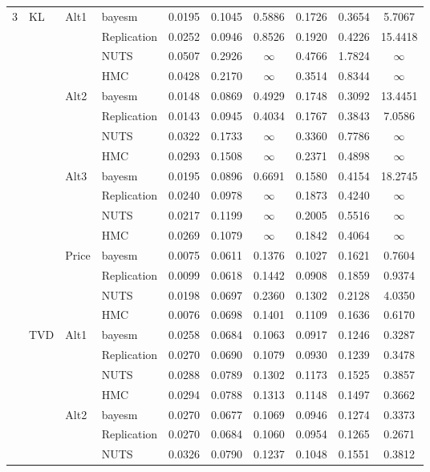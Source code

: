 \begin{longtable}{clllcccccc}
3 & KL & Alt1 & bayesm & 0.0195 & 0.1045 & 0.5886 & 0.1726 & 0.3654 & 5.7067 \\
 &  &  & Replication & 0.0252 & 0.0946 & 0.8526 & 0.1920 & 0.4226 & 15.4418 \\
 &  &  & NUTS & 0.0507 & 0.2926 & $\infty$ & 0.4766 & 1.7824 & $\infty$ \\
 &  &  & HMC & 0.0428 & 0.2170 & $\infty$ & 0.3514 & 0.8344 & $\infty$ \\
 &  & Alt2 & bayesm & 0.0148 & 0.0869 & 0.4929 & 0.1748 & 0.3092 & 13.4451 \\
 &  &  & Replication & 0.0143 & 0.0945 & 0.4034 & 0.1767 & 0.3843 & 7.0586 \\
 &  &  & NUTS & 0.0322 & 0.1733 & $\infty$ & 0.3360 & 0.7786 & $\infty$ \\
 &  &  & HMC & 0.0293 & 0.1508 & $\infty$ & 0.2371 & 0.4898 & $\infty$ \\
 &  & Alt3 & bayesm & 0.0195 & 0.0896 & 0.6691 & 0.1580 & 0.4154 & 18.2745 \\
 &  &  & Replication & 0.0240 & 0.0978 & $\infty$ & 0.1873 & 0.4240 & $\infty$ \\
 &  &  & NUTS & 0.0217 & 0.1199 & $\infty$ & 0.2005 & 0.5516 & $\infty$ \\
 &  &  & HMC & 0.0269 & 0.1079 & $\infty$ & 0.1842 & 0.4064 & $\infty$ \\
 &  & Price & bayesm & 0.0075 & 0.0611 & 0.1376 & 0.1027 & 0.1621 & 0.7604 \\
 &  &  & Replication & 0.0099 & 0.0618 & 0.1442 & 0.0908 & 0.1859 & 0.9374 \\
 &  &  & NUTS & 0.0198 & 0.0697 & 0.2360 & 0.1302 & 0.2128 & 4.0350 \\
 &  &  & HMC & 0.0076 & 0.0698 & 0.1401 & 0.1109 & 0.1636 & 0.6170 \\
 & TVD & Alt1 & bayesm & 0.0258 & 0.0684 & 0.1063 & 0.0917 & 0.1246 & 0.3287 \\
 &  &  & Replication & 0.0270 & 0.0690 & 0.1079 & 0.0930 & 0.1239 & 0.3478 \\
 &  &  & NUTS & 0.0288 & 0.0789 & 0.1302 & 0.1173 & 0.1525 & 0.3857 \\
 &  &  & HMC & 0.0294 & 0.0788 & 0.1313 & 0.1148 & 0.1497 & 0.3662 \\
 &  & Alt2 & bayesm & 0.0270 & 0.0677 & 0.1069 & 0.0946 & 0.1274 & 0.3373 \\
 &  &  & Replication & 0.0270 & 0.0684 & 0.1060 & 0.0954 & 0.1265 & 0.2671 \\
 &  &  & NUTS & 0.0326 & 0.0790 & 0.1237 & 0.1048 & 0.1551 & 0.3812 \\

\end{longtable}
